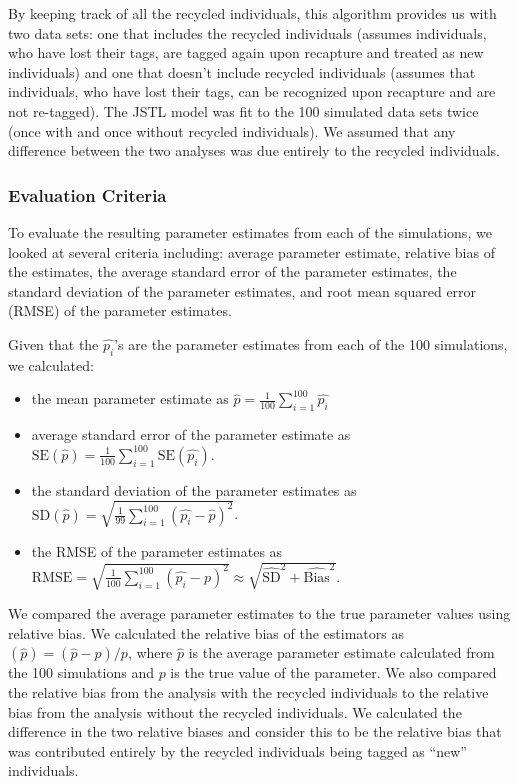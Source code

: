\documentclass[]{article}
\providecommand{\tightlist}{%
  \setlength{\itemsep}{0pt}\setlength{\parskip}{0pt}}
\begin{document}
By keeping track of all the recycled individuals, this algorithm 
provides us with two data sets: one that includes the recycled
individuals (assumes individuals, who have lost their tags, are tagged
again upon recapture and treated as new individuals) and one that
doesn't include recycled individuals (assumes that individuals, who
have lost their tags, can be recognized upon recapture and are not
re-tagged). The JSTL model was fit to the 100 simulated data sets twice
(once with and once without recycled individuals). We assumed that any
difference between the two analyses was due entirely to the recycled
individuals.

\subsubsection{Evaluation Criteria}\label{evaluation-criteria}

To evaluate the resulting parameter estimates from each of the simulations, we looked at several criteria including: average parameter
estimate, relative bias of the estimates, the average standard error of
the parameter estimates, the standard deviation of the parameter
estimates, and root mean squared error (RMSE) of the parameter
estimates.

Given that the \(\hat{p_i}\)'s are the parameter estimates from each of
the 100 simulations, we calculated:

\begin{itemize}
\tightlist
\item
  the mean parameter estimate as
  \(\hat{p}= \frac{1}{100} \sum_{i=1}^{100} \hat{p_i}\)
\item
  average standard error of the parameter estimate as
  \(\text{SE}(\hat{p})= \frac{1}{100} \sum_{i=1}^{100} \text{SE}(\hat{p_i})\).
\item
  the standard deviation of the parameter estimates as
  \(\text{SD}(\hat{p})= \sqrt{\frac{1}{99} \sum_{i=1}^{100} (\hat{p_i}-\hat{p})^2}\).
\item
  the RMSE of the parameter estimates as
  \(\text{RMSE}= \sqrt{\frac{1}{100} \sum_{i=1}^{100} (\hat{p_i}-p)^2} \approx \sqrt{\hat{\text{SD}}^2+\hat{\text{Bias}}^2}\).
\end{itemize}

We compared the average parameter estimates  to the true parameter
values using relative bias. We calculated the relative bias of the
estimators as \(\left(\hat{p}\right) =(\hat{p} -p)/p\), where
\(\hat{p}\) is the average parameter estimate calculated from the 100
simulations and \(p\) is the true value of the parameter. We also
compared the relative bias from the analysis with the recycled
individuals to the relative bias from the analysis without the recycled
individuals. We calculated the difference in the two relative biases and
consider this to be the relative bias that was contributed entirely by the
recycled individuals being tagged as ``new'' individuals.
\end{document}
